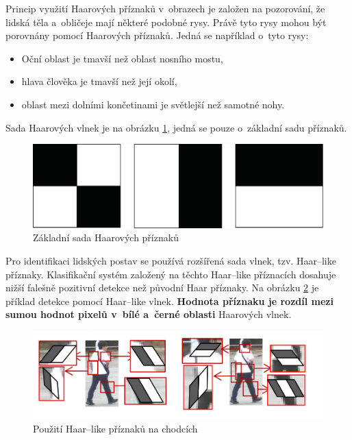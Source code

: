 Princip využití Haarových příznaků v~obrazech je založen na pozorování, že lidská těla a~obličeje mají některé podobné rysy. Právě tyto rysy mohou být porovnány pomocí Haarových příznaků. Jedná se například o~tyto rysy:
\begin{itemize}
  \item{Oční oblast je tmavší než oblast nosního mostu,}
  \item{hlava člověka je tmavší než její okolí,}
  \item{oblast mezi dolními končetinami je světlejší než samotné nohy.}
\end{itemize}
Sada Haarových vlnek je na obrázku \ref{fig:basichaarfeatures}, jedná se pouze o~základní sadu příznaků.
\begin{figure}[H]
\centering
\includegraphics[width=.4\linewidth]{assets/9_haar_features}
\caption{Základní sada Haarových příznaků}
\label{fig:basichaarfeatures}
\end{figure}

Pro identifikaci lidských postav se používá rozšířená sada vlnek, tzv. Haar--like příznaky. Klasifikační systém založený na těchto Haar--like příznacích dosahuje nižší falešně pozitivní detekce než původní Haar příznaky. Na obrázku \ref{fig:haarlike} je příklad detekce pomocí Haar--like vlnek. \textbf{Hodnota příznaku je rozdíl mezi sumou hodnot pixelů v~bílé a~černé oblasti} Haarových vlnek.
\begin{figure}[H]
\centering
\includegraphics[width=.8\linewidth]{assets/9_haar-like}
\caption{Použití Haar--like příznaků na chodcích}
\label{fig:haarlike}
\end{figure}

